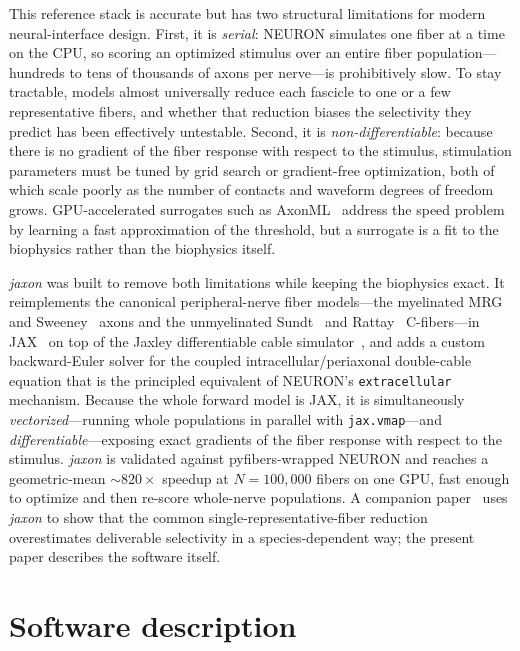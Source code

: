 \documentclass[preprint,12pt,a4paper]{elsarticle}
\begin{document}
This reference stack is accurate but has two structural limitations for modern
neural-interface design. First, it is \emph{serial}: NEURON simulates one fiber at a time on
the CPU, so scoring an optimized stimulus over an entire fiber population---hundreds to tens
of thousands of axons per nerve---is prohibitively slow. To stay tractable, models almost
universally reduce each fascicle to one or a few representative fibers, and whether that
reduction biases the selectivity they predict has been effectively untestable. Second, it is
\emph{non-differentiable}: because there is no gradient of the fiber response with respect to
the stimulus, stimulation parameters must be tuned by grid search or gradient-free
optimization, both of which scale poorly as the number of contacts and waveform degrees of
freedom grows. GPU-accelerated surrogates such as AxonML~\cite{axonml} address the speed
problem by learning a fast approximation of the threshold, but a surrogate is a fit to the
biophysics rather than the biophysics itself.

\emph{jaxon} was built to remove both limitations while keeping the biophysics exact. It
reimplements the canonical peripheral-nerve fiber models---the myelinated MRG~\cite{mcintyre}
and Sweeney~\cite{sweeney} axons and the unmyelinated Sundt~\cite{sundt} and
Rattay~\cite{rattay} C-fibers---in JAX~\cite{jax} on top of the Jaxley differentiable cable
simulator~\cite{jaxley}, and adds a custom backward-Euler solver for the coupled
intracellular/periaxonal double-cable equation that is the principled equivalent of NEURON's
\texttt{extracellular} mechanism. Because the whole forward model is JAX, it is
simultaneously \emph{vectorized}---running whole populations in parallel with
\texttt{jax.vmap}---and \emph{differentiable}---exposing exact gradients of the fiber response
with respect to the stimulus. \emph{jaxon} is validated against pyfibers-wrapped NEURON and
reaches a geometric-mean ${\sim}820\times$ speedup at $N=100{,}000$ fibers on one GPU, fast
enough to optimize and then re-score whole-nerve populations. A companion
paper~\cite{companion} uses \emph{jaxon} to show that the common single-representative-fiber
reduction overestimates deliverable selectivity in a species-dependent way; the present paper
describes the software itself.

\section{Software description}
\end{document}
